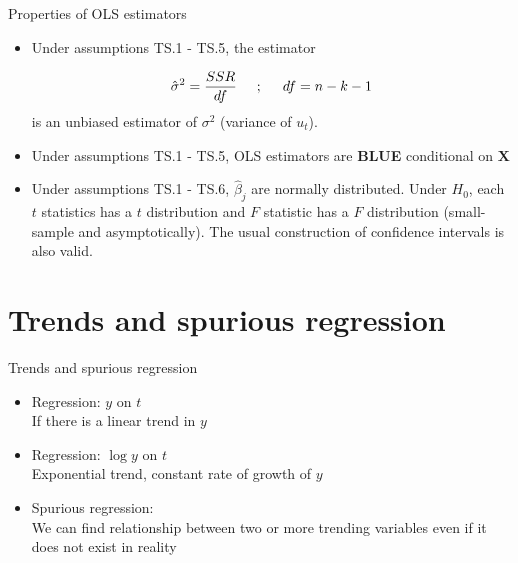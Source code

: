 \documentclass{beamer}
\begin{document}
\begin{frame}{Properties of OLS estimators}
\begin{itemize}
\item Under assumptions TS.1 - TS.5, the estimator 

$$\hat{\sigma}^2=\frac{SSR}{df} \hspace{0.5cm} ; \hspace{0.5cm} df=n-k-1 $$   
is an unbiased estimator of $\sigma^2$ (variance of $u_t$).

\vspace{0.5cm}

\item Under assumptions TS.1 - TS.5, OLS estimators are \textbf{BLUE} conditional on $\boldsymbol{X}$

\vspace{0.5cm}

\item Under assumptions TS.1 - TS.6, $\hat{\beta}_j$ are normally distributed. Under $H_0$, each $t$ statistics has a $t$ distribution and $F$ statistic has a $F$ distribution (small-sample and asymptotically). The usual construction of confidence intervals is also valid. 
\end{itemize}
\end{frame}


\section{Trends and spurious regression}

\begin{frame}{Trends and spurious regression}
\begin{itemize}
\item Regression: $y$ on $t$ \\ If there is a linear trend in $y$
\vspace{0.5cm}
\item Regression: $\log{y}$ on $t$ \\ Exponential trend, constant rate of growth of $y$
\vspace{0.5cm}
\item Spurious regression: \\ We can find relationship between two or more trending variables even if it does not exist in reality
\end{itemize}
\end{frame}
\end{document}
